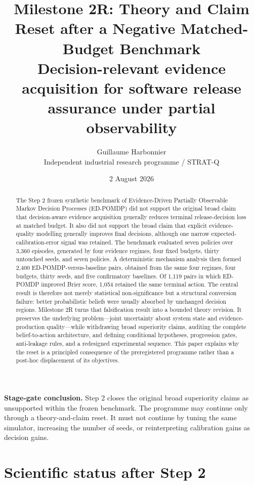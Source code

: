 \documentclass[11pt,a4paper]{article}
\title{\textbf{Milestone 2R: Theory and Claim Reset after a Negative Matched-Budget Benchmark}\\
\large Decision-relevant evidence acquisition for software release assurance under partial observability}
\author{Guillaume Harbonnier\\Independent industrial research programme / STRAT-Q}
\date{2 August 2026}
\begin{document}
\maketitle

\begin{abstract}
The Step 2 frozen synthetic benchmark of Evidence-Driven Partially Observable Markov Decision Processes (ED-POMDP) did not support the original broad claim that decision-aware evidence acquisition generally reduces terminal release-decision loss at matched budget. It also did not support the broad claim that explicit evidence-quality modelling generally improves final decisions, although one narrow expected-calibration-error signal was retained. The benchmark evaluated seven policies over 3,360 episodes, generated by four evidence regimes, four fixed budgets, thirty untouched seeds, and seven policies. A deterministic mechanism analysis then formed 2,400 ED-POMDP-versus-baseline pairs, obtained from the same four regimes, four budgets, thirty seeds, and five confirmatory baselines. Of 1,119 pairs in which ED-POMDP improved Brier score, 1,054 retained the same terminal action. The central result is therefore not merely statistical non-significance but a structural conversion failure: better probabilistic beliefs were usually absorbed by unchanged decision regions. Milestone 2R turns that falsification result into a bounded theory revision. It preserves the underlying problem---joint uncertainty about system state and evidence-production quality---while withdrawing broad superiority claims, auditing the complete belief-to-action architecture, and defining conditional hypotheses, progression gates, anti-leakage rules, and a redesigned experimental sequence. This paper explains why the reset is a principled consequence of the preregistered programme rather than a post-hoc displacement of its objectives.
\end{abstract}

\begin{tcolorbox}[colback=softblue,colframe=deepblue,boxrule=0.8pt,arc=2mm]
\textbf{Stage-gate conclusion.} Step 2 closes the original broad superiority claims as unsupported within the frozen benchmark. The programme may continue only through a theory-and-claim reset. It must not continue by tuning the same simulator, increasing the number of seeds, or reinterpreting calibration gains as decision gains.
\end{tcolorbox}

\section{Scientific status after Step 2}
\end{document}
